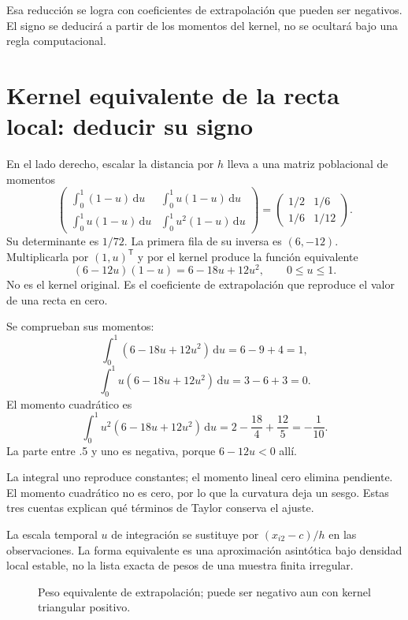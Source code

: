 \documentclass[11pt,a4paper]{article}
\newcommand{\T}{^{\mathsf T}}
\newcommand{\dd}{\,\mathrm d}
\begin{document}
Esa reducción se logra con coeficientes
de extrapolación que pueden ser negativos.
El signo se deducirá a partir de
los momentos del kernel, no se
ocultará bajo una regla computacional.

\clearpage
\section{Kernel equivalente de la recta local: deducir su signo}\label{unidad32}
En el lado derecho, escalar la distancia por \(h\)
lleva a una matriz poblacional de momentos
\[
\begin{pmatrix}
\int_0^1(1-u)\dd u&\int_0^1u(1-u)\dd u\\
\int_0^1u(1-u)\dd u&\int_0^1u^2(1-u)\dd u
\end{pmatrix}
=\begin{pmatrix}1/2&1/6\\1/6&1/12\end{pmatrix}.
\]
Su determinante es \(1/72\).
La primera fila de su inversa es \((6,-12)\).
Multiplicarla por \((1,u)\T\) y por el kernel
produce la función equivalente
\[
(6-12u)(1-u)=6-18u+12u^2,\qquad0\le u\le1.
\]
No es el kernel original.
Es el coeficiente de extrapolación
que reproduce el valor de una recta en cero.

Se comprueban sus momentos:
\[
\int_0^1(6-18u+12u^2)\dd u=6-9+4=1,
\]
\[
\int_0^1u(6-18u+12u^2)\dd u=3-6+3=0.
\]
El momento cuadrático es
\[
\int_0^1u^2(6-18u+12u^2)\dd u
=2-\frac{18}{4}+\frac{12}{5}=-\frac1{10}.
\]
La parte entre .5 y uno es negativa,
porque \(6-12u<0\) allí.

La integral uno reproduce constantes;
el momento lineal cero elimina pendiente.
El momento cuadrático no es cero,
por lo que la curvatura deja un sesgo.
Estas tres cuentas explican
qué términos de Taylor conserva el ajuste.

La escala temporal \(u\) de integración
se sustituye por \((x_{i2}-c)/h\)
en las observaciones.
La forma equivalente es una aproximación
asintótica bajo densidad local estable,
no la lista exacta de pesos de
una muestra finita irregular.

\begin{figure}[H]\centering
{}
\caption{Peso equivalente de extrapolación; puede ser negativo aun con kernel triangular positivo.}
\end{figure}
\end{document}
